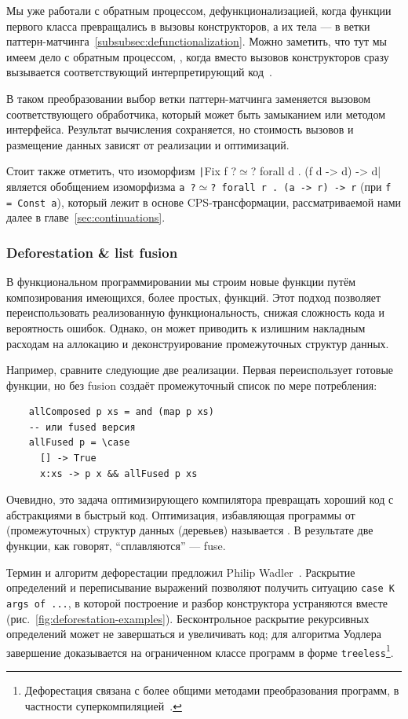 Мы уже работали с обратным процессом, дефункционализацией, когда функции первого класса превращались в вызовы конструкторов, а их тела --- в ветки паттерн-матчинга~\ref{subsubsec:defunctionalization}.
Можно заметить, что тут мы имеем дело с обратным процессом, , когда вместо вызовов конструкторов сразу вызывается соответствующий интерпретирующий код~\cite{DANVY2009534}.

В таком преобразовании выбор ветки паттерн-матчинга заменяется вызовом соответствующего обработчика, который может быть замыканием или методом интерфейса.
Результат вычисления сохраняется, но стоимость вызовов и размещение данных зависят от реализации и оптимизаций.

Стоит также отметить, что изоморфизм \texttt|Fix f ?$\simeq$? forall d . (f d -> d) -> d| является обобщением изоморфизма \texttt{a ?$\simeq$? forall r . (a -> r) -> r} (при \texttt{f = Const a}), который лежит в основе CPS-трансформации, рассматриваемой нами далее в главе~\ref{sec:continuations}.

\subsubsection{Deforestation \& list fusion} \label{subsubsec:deforestation-fusion}

В функциональном программировании мы строим новые функции путём композирования имеющихся, более простых, функций.
Этот подход позволяет переиспользовать реализованную функциональность, снижая сложность кода и вероятность ошибок.
Однако, он может приводить к излишним накладным расходам на аллокацию и деконструирование промежуточных структур данных.

Например, сравните следующие две реализации.
Первая переиспользует готовые функции, но без fusion создаёт промежуточный список по мере потребления:
\begin{verbatim}
    allComposed p xs = and (map p xs)
    -- или fused версия
    allFused p = \case
      [] -> True
      x:xs -> p x && allFused p xs
\end{verbatim}

Очевидно, это задача оптимизирующего компилятора превращать хороший код с абстракциями в быстрый код.
Оптимизация, избавляющая программы от (промежуточных) структур данных (деревьев) называется .
В результате две функции, как говорят, ``сплавляются'' --- fuse.

Термин и алгоритм дефорестации предложил Philip Wadler~\cite{wadler1988deforestation}.
Раскрытие определений и переписывание выражений позволяют получить ситуацию \texttt{case K args of ...}, в которой построение и разбор конструктора устраняются вместе (рис.~\ref{fig:deforestation-examples}).
Бесконтрольное раскрытие рекурсивных определений может не завершаться и увеличивать код; для алгоритма Уодлера завершение доказывается на ограниченном классе программ в форме \texttt{treeless}\footnote{Дефорестация связана с более общими методами преобразования программ, в частности суперкомпиляцией~\cite{supercomp}.}.

